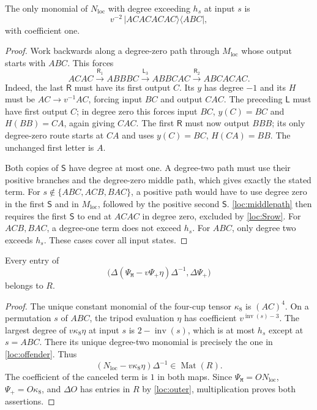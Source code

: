 \documentclass[a4paper,11pt]{amsart}
\newcommand{\inv}{\operatorname{inv}}
\newcommand{\wordmiddle}{\mathtt{M}}
\newcommand{\middlemap}{{\Psi}_{{\wordmiddle}}}
\newcommand{\createmap}{{\Psi}_+}
\newcommand{\tpar}{v}
\numberwithin{equation}{subsection}
\theoremstyle{plain}
\theoremstyle{definition}
\theoremstyle{remark}
\begin{document}
\begin{lemma}\label{loc:offender}
The only monomial of $N_{\mathrm{loc}}$ with degree exceeding $h_s$ at input $s$
is
\[
 \tpar^{-2}\,|ACACACAC\rangle\langle ABC|,
\]
with coefficient one.
\end{lemma}

\begin{proof}
Work backwards along a degree-zero path through $M_{\mathrm{loc}}$
whose output starts with $ABC$. This forces
\begin{equation}\label{loc:middlepath}
ACAC\xrightarrow{\mathsf R_1}ABBBC
\xrightarrow{\mathsf L_3}ABBCAC
\xrightarrow{\mathsf R_2}ABCACAC.
\end{equation}
Indeed, the last $\mathsf R$ must have its first output $C$. Its $y$ has
degree $-1$ and its $H$ must be $AC\to \tpar^{-1} AC$, forcing input $BC$
and output $CAC$. The preceding $\mathsf L$ must have first output $C$;
in degree zero this forces input $BC$, $y(C)=BC$ and $H(BB)=CA$,
again giving $CAC$. The first $\mathsf R$ must now output $BBB$;
its only degree-zero route starts at $CA$ and uses $y(C)=BC$,
$H(CA)=BB$. The unchanged first letter is $A$.

Both copies of $\mathsf S$ have degree at most one. A degree-two path
must use their positive branches and the degree-zero middle path,
which gives exactly the stated term. For $s\notin\{ABC,ACB,BAC\}$,
a positive path would have to use degree zero in the first $\mathsf S$
and in $M_{\mathrm{loc}}$, followed by the positive second $\mathsf S$.
\autoref{loc:middlepath} then requires the first $\mathsf S$ to end at
$ACAC$ in degree zero, excluded by \autoref{loc:Srow}. For $ACB,BAC$, a degree-one term does not exceed $h_s$. For $ABC$,
only degree two exceeds $h_s$. These cases cover all input states.
\end{proof}

\begin{lemma}\label{loc:upper}
Every entry of
\[
\bigl(\Delta(\middlemap-\tpar\createmap\eta)\Delta^{-1},\Delta \createmap\bigr)
\]
belongs to $R$.
\end{lemma}

\begin{proof}
The unique constant monomial of the four-cup tensor $\kappa_8$ is
$(AC)^4$. On a permutation $s$ of $ABC$, the tripod evaluation $\eta$ has coefficient
$\tpar^{\inv(s)-3}$. The largest degree of $\tpar\kappa_8\eta$ at input $s$ is
$2-\inv(s)$, which is at most $h_s$ except at $s=ABC$.
There its unique degree-two monomial is precisely the one in
\autoref{loc:offender}. Thus
\[
(N_{\mathrm{loc}}-\tpar\kappa_8\eta)\Delta^{-1}\in\operatorname{Mat}(R).
\]
The coefficient of the canceled term is $1$ in both maps. Since
$\middlemap=ON_{\mathrm{loc}}$, $\createmap=O \kappa_8$, and $\Delta O$ has entries in $R$
by \autoref{loc:outer}, multiplication proves both assertions.
\end{proof}
\end{document}
